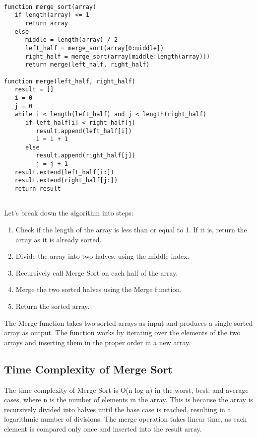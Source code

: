 \documentclass[a4paper, 11pt, oneside]{book} %
\begin{document}
\begin{verbatim}

function merge_sort(array)
   if length(array) <= 1
      return array
   else
      middle = length(array) / 2
      left_half = merge_sort(array[0:middle])
      right_half = merge_sort(array[middle:length(array)])
      return merge(left_half, right_half)
      
function merge(left_half, right_half)
   result = []
   i = 0
   j = 0
   while i < length(left_half) and j < length(right_half)
      if left_half[i] < right_half[j]
         result.append(left_half[i])
         i = i + 1
      else
         result.append(right_half[j])
         j = j + 1
   result.extend(left_half[i:])
   result.extend(right_half[j:])
   return result
      
\end{verbatim}

Let's break down the algorithm into steps:

\begin{enumerate}
  \item Check if the length of the array is less than or equal to 1. If it is, return the array as it is already sorted.
  \item Divide the array into two halves, using the middle index.
  \item Recursively call Merge Sort on each half of the array.
  \item Merge the two sorted halves using the Merge function.
  \item Return the sorted array.
\end{enumerate}

\vspace{0.75\baselineskip} %

The Merge function takes two sorted arrays as input and produces a single sorted array as output. The function works by iterating over the elements of the two arrays and inserting them in the proper order in a new array.

\subsection{Time Complexity of Merge Sort}
The time complexity of Merge Sort is O(n log n) in the worst, best, and average cases, where n is the number of elements in the array. This is because the array is recursively divided into halves until the base case is reached, resulting in a logarithmic number of divisions. The merge operation takes linear time, as each element is compared only once and inserted into the result array.
\end{document}
